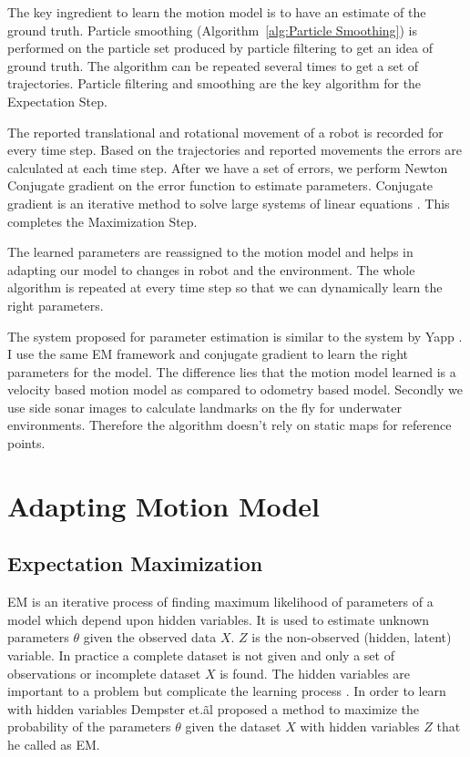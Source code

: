 \documentclass[12pt]{dalcsthesis}
\begin{document}
The key ingredient to learn the motion model is to have an estimate of the ground truth. Particle smoothing (Algorithm~\ref{alg:Particle Smoothing}) is performed on the particle set produced by particle filtering to get an idea of ground truth. The algorithm can be repeated several times to get a set of trajectories. Particle filtering and smoothing are the key algorithm for the Expectation Step. 

The reported translational and rotational movement of a robot is recorded for every time step. Based on the trajectories and reported movements the errors are calculated at each time step. After we have a set of errors, we perform Newton Conjugate gradient on the error function to estimate parameters. Conjugate gradient is an iterative method to solve large systems of linear equations \cite{shewchuk1994introduction}. This completes the Maximization Step.

The learned parameters are reassigned to the motion model and helps in adapting our model to changes in robot and the environment. The whole algorithm is repeated at every time step so that we can dynamically learn the right parameters.

The system proposed for parameter estimation is similar to the system by Yapp \cite{Yap2008}. I use the same EM framework and conjugate gradient to learn the right parameters for the model. The difference lies that the motion model learned is a velocity based motion model as compared to odometry based model. Secondly we use side sonar images to calculate landmarks on the fly for underwater environments. Therefore the algorithm doesn't rely on static maps for reference points.

\section{Adapting Motion Model}
\label{adapting the motion model}
\subsection{Expectation Maximization}

EM is an iterative process of finding maximum likelihood of parameters of a model which depend upon hidden variables. It is used to estimate unknown parameters $\theta$ given the observed data $X$. $Z$ is the non-observed (hidden, latent) variable. In practice a complete dataset is not given and only a set of observations or incomplete dataset $X$ is found. The hidden variables are important to a problem but complicate the learning process \cite{russell2003artificial}. In order to learn with hidden variables Dempster et.\~al \cite{dempster1977maximum} proposed a method to maximize the probability of the parameters $\theta$ given the dataset $X$ with hidden variables $Z$ that he called as EM.
\end{document}
